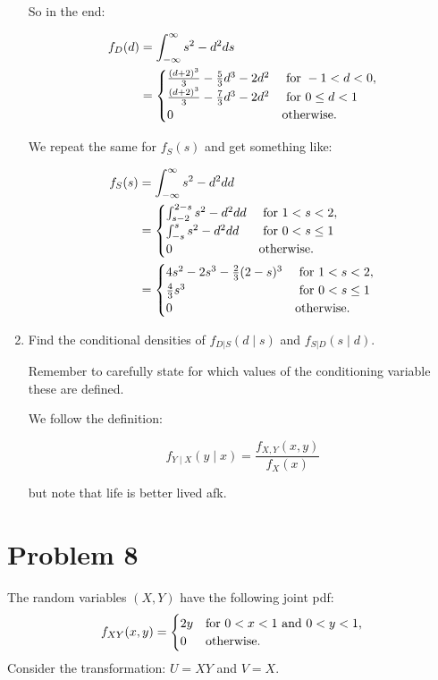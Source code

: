 \documentclass{article}
\newcommand{\1}{\mathbf{1}}
\begin{document}
\begin{enumerate}
    So in the end:
    
    \begin{align*}
    f_{D}(d) &= \int_{-\infty}^\infty s^2 - d^2 ds \\
    &= \begin{cases}
       \frac{(d+2)^3}{3} - \frac{5}{3} d^3 - 2d^2 &\hbox{ for } -1 < d < 0, \\
       \frac{(d+2)^3}{3} - \frac{7}{3} d^3 - 2d^2   &\hbox{ for } 0\leq d < 1 \\
       0 &\hbox{otherwise.}
       \end{cases}
    \end{align*}
    
    \newpage
    We repeat the same for $f_{S}(s)$ and get something like:
    
    \begin{align*}
    f_{S}(s) &= \int_{-\infty}^\infty s^2 - d^2 dd \\
    &= \begin{cases}
       \int_{s-2}^{2-s} s^2 - d^2 dd &\hbox{ for } 1 < s < 2, \\
       \int_{-s}^{s} s^2 - d^2 dd  &\hbox{ for } 0 < s\leq 1 \\
       0 &\hbox{otherwise.}
       \end{cases} \\
    &= \begin{cases}
       4s^2 - 2s^3 - \frac{2}{3}(2-s)^3 &\hbox{ for }  1 < s < 2, \\
       \frac{4}{3}s^3  &\hbox{ for } 0 < s\leq 1 \\
       0 &\hbox{otherwise.}
       \end{cases} \\
    \end{align*}
    
    
    \item Find the conditional densities of $f_{D|S}(d\mid s)$ and $f_{S|D}(s\mid d)$.\par
    Remember to carefully state for which values of the conditioning variable these are defined.
    
    We follow the definition: 
    
    $$f_{Y\mid X}(y \mid x) = \frac{f_{X, Y}(x, y)}{f_X(x)}$$
    
    but note that life is better lived afk.
\end{enumerate}



\newpage
\section*{Problem 8} The random variables $(X,Y)$ have the following joint pdf:
$$f_{XY}(x,y) = \begin{cases}
    2y & \hbox{for } 0 < x < 1 \hbox{ and } 0 < y <1,\\ 
    0 & \hbox{otherwise.}
    \end{cases}
$$
Consider the transformation: $U = XY$ and $ V=X$.
\end{document}
